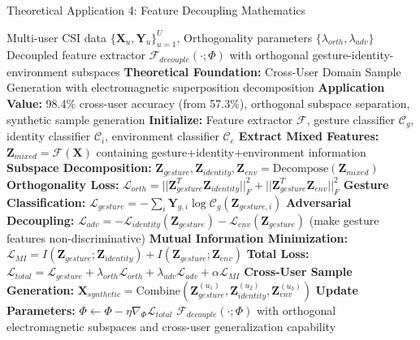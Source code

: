 \documentclass[journal]{IEEEtran}
\begin{document}
\begin{algorithm}[h]
\caption{Theoretical Application 4: Feature Decoupling Mathematics}
\label{alg:feature_decoupling}
\begin{algorithmic}[1]
\REQUIRE Multi-user CSI data $\{\mathbf{X}_u, \mathbf{Y}_u\}_{u=1}^{U}$, Orthogonality parameters $\{\lambda_{orth}, \lambda_{adv}\}$
\ENSURE Decoupled feature extractor $\mathcal{F}_{decouple}(\cdot; \Phi)$ with orthogonal gesture-identity-environment subspaces
\STATE \textbf{Theoretical Foundation:} Cross-User Domain Sample Generation \cite{wang2024feature} with electromagnetic superposition decomposition
\STATE \textbf{Application Value:} 98.4\% cross-user accuracy (from 57.3\%), orthogonal subspace separation, synthetic sample generation
\STATE \textbf{Initialize:} Feature extractor $\mathcal{F}$, gesture classifier $\mathcal{C}_g$, identity classifier $\mathcal{C}_i$, environment classifier $\mathcal{C}_e$
\STATE \textbf{Extract Mixed Features:} $\mathbf{Z}_{mixed} = \mathcal{F}(\mathbf{X})$ containing gesture+identity+environment information
\STATE \textbf{Subspace Decomposition:} $\mathbf{Z}_{gesture}, \mathbf{Z}_{identity}, \mathbf{Z}_{env} = \text{Decompose}(\mathbf{Z}_{mixed})$
\STATE \textbf{Orthogonality Loss:} $\mathcal{L}_{orth} = ||\mathbf{Z}_{gesture}^T \mathbf{Z}_{identity}||_F^2 + ||\mathbf{Z}_{gesture}^T \mathbf{Z}_{env}||_F^2$
\STATE \textbf{Gesture Classification:} $\mathcal{L}_{gesture} = -\sum_i \mathbf{Y}_{g,i} \log \mathcal{C}_g(\mathbf{Z}_{gesture,i})$
\STATE \textbf{Adversarial Decoupling:} $\mathcal{L}_{adv} = -\mathcal{L}_{identity}(\mathbf{Z}_{gesture}) - \mathcal{L}_{env}(\mathbf{Z}_{gesture})$ (make gesture features non-discriminative)
\STATE \textbf{Mutual Information Minimization:} $\mathcal{L}_{MI} = I(\mathbf{Z}_{gesture}; \mathbf{Z}_{identity}) + I(\mathbf{Z}_{gesture}; \mathbf{Z}_{env})$
\STATE \textbf{Total Loss:} $\mathcal{L}_{total} = \mathcal{L}_{gesture} + \lambda_{orth}\mathcal{L}_{orth} + \lambda_{adv}\mathcal{L}_{adv} + \alpha\mathcal{L}_{MI}$
\STATE \textbf{Cross-User Sample Generation:} $\mathbf{X}_{synthetic} = \text{Combine}(\mathbf{Z}_{gesture}^{(u_1)}, \mathbf{Z}_{identity}^{(u_2)}, \mathbf{Z}_{env}^{(u_3)})$
\STATE \textbf{Update Parameters:} $\Phi \leftarrow \Phi - \eta \nabla_{\Phi} \mathcal{L}_{total}$
\RETURN $\mathcal{F}_{decouple}(\cdot; \Phi)$ with orthogonal electromagnetic subspaces and cross-user generalization capability
\end{algorithmic}
\end{algorithm}
\end{document}
